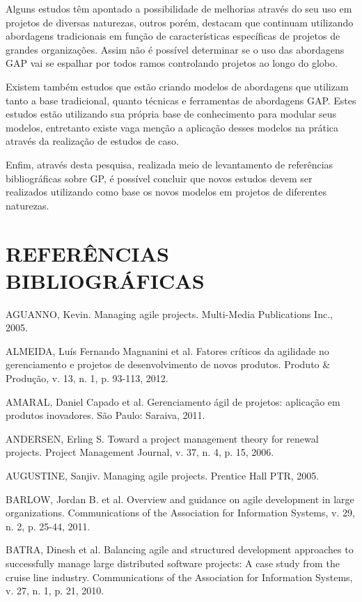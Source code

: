 Alguns estudos têm apontado a possibilidade de melhorias através do seu uso em projetos de diversas naturezas, outros porém, destacam que continuam utilizando abordagens tradicionais em função de características específicas de projetos de grandes organizações. Assim não é possível determinar se o uso das abordagens GAP vai se espalhar por todos ramos controlando projetos ao longo do globo.

Existem também estudos que estão criando modelos de abordagens que utilizam tanto a base tradicional, quanto técnicas e ferramentas de abordagens GAP. Estes estudos estão utilizando sua própria base de conhecimento para modular seus modelos, entretanto existe vaga menção a aplicação desses modelos na prática através da realização de estudos de caso.

Enfim, através desta pesquisa, realizada meio de levantamento de referências bibliográficas sobre GP, é possível concluir que novos estudos devem ser realizados utilizando como base os novos modelos em projetos de diferentes naturezas.

\singlespacing
\setlength\parindent{0pt}
\section{REFERÊNCIAS BIBLIOGRÁFICAS}

AGUANNO, Kevin. Managing agile projects. Multi-Media Publications Inc., 2005.

ALMEIDA, Luís Fernando Magnanini et al. Fatores críticos da agilidade no gerenciamento e projetos de desenvolvimento de novos produtos. Produto \& Produção, v. 13, n. 1, p. 93-113, 2012.

AMARAL, Daniel Capado et al. Gerenciamento ágil de projetos: aplicação em produtos inovadores. São Paulo: Saraiva, 2011.

ANDERSEN, Erling S. Toward a project management theory for renewal projects. Project Management Journal, v. 37, n. 4, p. 15, 2006.

AUGUSTINE, Sanjiv. Managing agile projects. Prentice Hall PTR, 2005.

BARLOW, Jordan B. et al. Overview and guidance on agile development in large organizations. Communications of the Association for Information Systems, v. 29, n. 2, p. 25-44, 2011.

BATRA, Dinesh et al. Balancing agile and structured development approaches to successfully manage large distributed software projects: A case study from the cruise line industry. Communications of the Association for Information Systems, v. 27, n. 1, p. 21, 2010.

